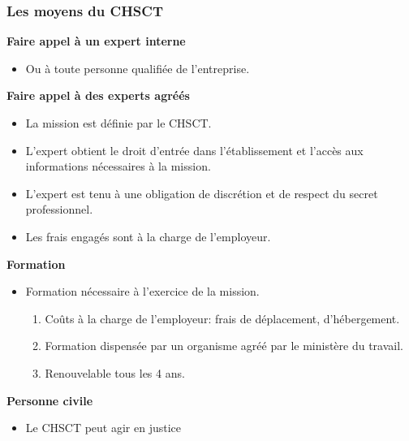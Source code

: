 \documentclass{beamer}
\begin{document}
\begin{frame}
\frametitle{Les moyens du CHSCT}

\textbf{Faire appel à un expert interne}
\begin{itemize}
\item Ou à toute personne  qualifiée de l’entreprise.
\end{itemize}

\textbf{Faire appel à des experts agréés}
 
\begin{itemize}
\item La mission est définie par le CHSCT.

\item L’expert obtient le droit d’entrée dans l’établissement et l’accès aux informations nécessaires à la mission.

\item L’expert est tenu à une obligation de discrétion et de respect du secret professionnel.

\item Les frais engagés sont à la charge de l’employeur.
\end{itemize}
\textbf{Formation}
\begin{itemize}
\item Formation nécessaire à l’exercice de la mission.
\begin{enumerate}
\item Coûts à la charge de l’employeur: frais de déplacement, d’hébergement.

\item Formation dispensée par un organisme agréé par le ministère du travail.

\item Renouvelable tous les 4 ans.
\end{enumerate}
\end{itemize}
\textbf{Personne civile}
\begin{itemize}
\item Le CHSCT peut agir en justice
\end{itemize}
\end{frame}
\end{document}
